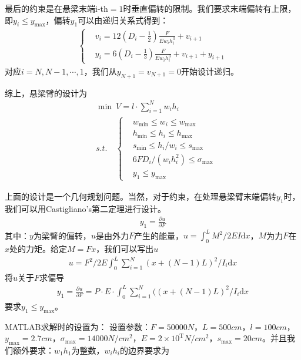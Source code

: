     最后的约束是在悬梁末端i-th$=1$时垂直偏转的限制。我们要求末端偏转有上限，即$y_i\leqslant y_{\max}$，偏转$y_1$可以由递归关系式得到：
    \begin{align*}
     \left\{
    \begin{aligned}
    &v_i=12 \left( D_i-\frac12 \right) \frac {F}{Ew_ih_i^3}+v_{i+1}\\
    &y_i=6 \left( D_i-\frac13 \right) \frac {F}{Ew_ih_i^3}+v_{i+1}+y_{i+1}
    \end{aligned}
        \right.
    \end{align*}
    对应$i=N,N-1,\cdots,1$，我们从$y_{N+1}=v_{N+1}=0$开始设计递归。
    \par
    综上，悬梁臂的设计为
    \begin{align*}
    &\mathop{\min}\  V=l\cdot \mathop{\sum}\limits_{i=1}^{N}w_ih_i\\
    &s.t.\quad \left\{
    \begin{aligned}
    &w_{\min}\leqslant w_i\leqslant w_{\max}\\
    &h_{\min}\leqslant h_i\leqslant h_{\max}\\
    &s_{\min}\leqslant h_i/w_i\leqslant s_{\max}\\
    &6FD_i/(w_ih_i^2)\leqslant {\sigma}_{\max}\\
    &y_1\leqslant y_{\max}
    \end{aligned}
        \right.
    \end{align*}
    \par
    上面的设计是一个几何规划问题。当然，对于约束，在处理悬梁臂末端偏转$y_1$时，我们可以用Castigliano's第二定理进行设计。
    \begin{align*}
    y_1 = \frac{\partial u}{\partial F}
    \end{align*}
    其中：$y$为梁臂的偏转，$u$是由外力$F$产生的能量，$u={\int}_0^LM^2/2EI\mathrm{d}x$，$M$为力$F$在$x$处的力矩。给定$M=Fx$，我们可以写出$u$
    \begin{align*}
    u = F^2/2  E \int_0^L \mathop{\sum}\limits_{i=1}^{N}(x+(N-1)L)^2/I_i  \mathrm{d}x
    \end{align*}
    将$u$关于$F$求偏导
    \begin{align*}
    y_1 = \frac{\partial u}{\partial F} = P\cdot E\cdot {\int}_0^L\mathop{\sum}\limits_{i=1}^{N}((x+(N-1)L)^2/I_i\mathrm{d}x
    \end{align*}
    要求$y_1\leqslant y_{\max}$。
    \par
    MATLAB求解时的设置为：
    设置参数：$F=50000N$，$L=500cm$，$l=100cm$，$y_{\max}=2.7cm$，${\sigma}_{\max}=14000N/cm^2$，$E=2\times {10}^\mathrm{T} N/cm^2$，$s_{\max}=20cm$。并且我们额外要求：$w_1h_1$为整数，$w_ih_i$的边界要求为
